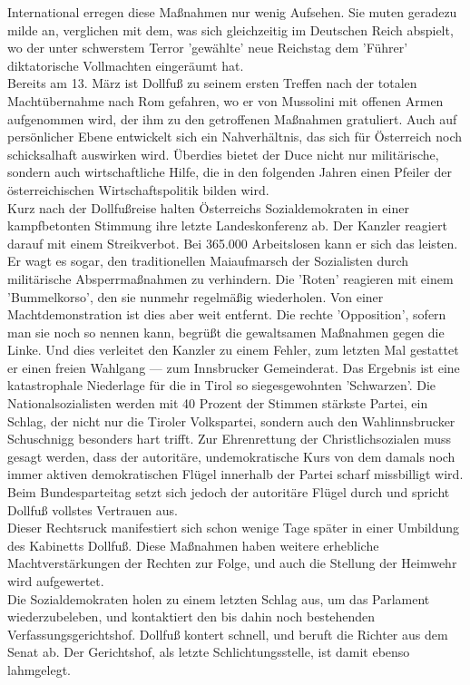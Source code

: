 \documentclass[letterpaper, 12pt]{article}
\begin{document}
International erregen diese Maßnahmen nur wenig Aufsehen. Sie muten geradezu milde an, verglichen mit dem, was sich gleichzeitig im Deutschen Reich abspielt, wo der unter schwerstem Terror 'gewählte' neue Reichstag dem 'Führer' diktatorische Vollmachten eingeräumt hat. \\
Bereits am 13. März ist Dollfuß zu seinem ersten Treffen nach der totalen Machtübernahme nach Rom gefahren, wo er von Mussolini mit offenen Armen aufgenommen wird, der ihm zu den getroffenen Maßnahmen gratuliert. Auch auf persönlicher Ebene entwickelt sich ein Nahverhältnis, das sich für Österreich noch schicksalhaft auswirken wird. Überdies bietet der Duce nicht nur militärische, sondern auch wirtschaftliche Hilfe, die in den folgenden Jahren einen Pfeiler der österreichischen Wirtschaftspolitik bilden wird. \\
Kurz nach der Dollfußreise halten Österreichs Sozialdemokraten in einer kampfbetonten Stimmung ihre letzte Landeskonferenz ab. Der Kanzler reagiert darauf mit einem Streikverbot. Bei 365.000 Arbeitslosen kann er sich das leisten. Er wagt es sogar, den traditionellen Maiaufmarsch der Sozialisten durch militärische Absperrmaßnahmen zu verhindern. Die 'Roten' reagieren mit einem 'Bummelkorso', den sie nunmehr regelmäßig wiederholen. Von einer Machtdemonstration ist dies aber weit entfernt. Die rechte 'Opposition', sofern man sie noch so nennen kann, begrüßt die gewaltsamen Maßnahmen gegen die Linke. Und dies verleitet den Kanzler zu einem Fehler, zum letzten Mal gestattet er einen freien Wahlgang — zum Innsbrucker Gemeinderat. Das Ergebnis ist eine katastrophale Niederlage für die in Tirol so siegesgewohnten 'Schwarzen'. Die
Nationalsozialisten werden mit 40 Prozent der Stimmen stärkste
Partei, ein Schlag, der nicht nur die Tiroler Volkspartei, sondern
auch den Wahlinnsbrucker Schuschnigg besonders hart trifft. Zur Ehrenrettung der Christlichsozialen muss gesagt werden, dass der autoritäre, undemokratische Kurs von dem damals noch immer aktiven demokratischen Flügel innerhalb der Partei scharf missbilligt wird. Beim Bundesparteitag setzt sich jedoch der autoritäre Flügel durch und spricht Dollfuß vollstes Vertrauen aus. \\
Dieser Rechtsruck manifestiert sich schon wenige Tage später in einer Umbildung des Kabinetts Dollfuß. Diese Maßnahmen haben weitere erhebliche Machtverstärkungen der Rechten zur Folge, und auch die Stellung der Heimwehr wird aufgewertet. \\
Die Sozialdemokraten holen zu einem letzten Schlag aus, um das Parlament wiederzubeleben, und kontaktiert den bis dahin noch bestehenden Verfassungsgerichtshof. Dollfuß kontert schnell, und beruft die Richter aus dem Senat ab. Der Gerichtshof, als letzte Schlichtungsstelle, ist damit ebenso lahmgelegt.
\end{document}
